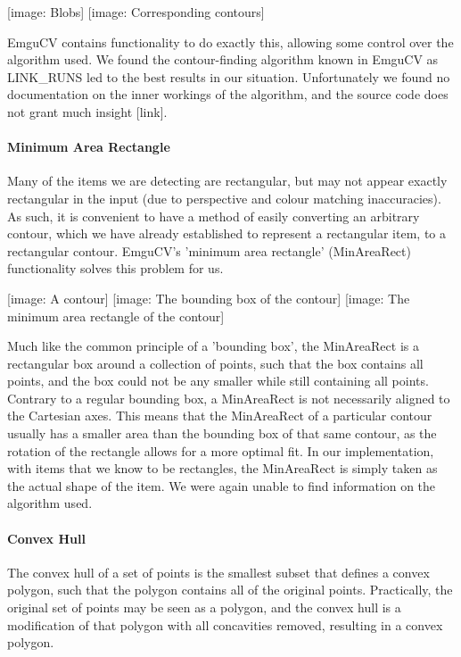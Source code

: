 \documentclass[10pt,twocolumn]{article}
\begin{document}
[image: Blobs] [image: Corresponding contours]

EmguCV contains functionality to do exactly this, allowing some control over the algorithm used. We found the contour-finding algorithm known in EmguCV as LINK\_RUNS led to the best results in our situation. Unfortunately we found no documentation on the inner workings of the algorithm, and the source code does not grant much insight [link].

\paragraph{Minimum Area Rectangle}
Many of the items we are detecting are rectangular, but may not appear exactly rectangular in the input (due to perspective and colour matching inaccuracies). As such, it is convenient to have a method of easily converting an arbitrary contour, which we have already established to represent a rectangular item, to a rectangular contour. EmguCV's 'minimum area rectangle' (MinAreaRect) functionality solves this problem for us.

[image: A contour] [image: The bounding box of the contour] [image: The minimum area rectangle of the contour]

Much like the common principle of a 'bounding box', the MinAreaRect is a rectangular box around a collection of points, such that the box contains all points, and the box could not be any smaller while still containing all points. Contrary to a regular bounding box, a MinAreaRect is not necessarily aligned to the Cartesian axes. This means that the MinAreaRect of a particular contour usually has a smaller area than the bounding box of that same contour, as the rotation of the rectangle allows for a more optimal fit. In our implementation, with items that we know to be rectangles, the MinAreaRect is simply taken as the actual shape of the item. We were again unable to find information on the algorithm used.

\paragraph{Convex Hull}
The convex hull of a set of points is the smallest subset that defines a convex polygon, such that the polygon contains all of the original points. Practically, the original set of points may be seen as a polygon, and the convex hull is a modification of that polygon with all concavities removed, resulting in a convex polygon.
\end{document}
